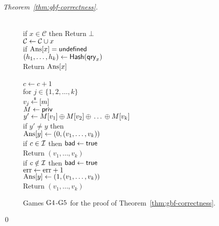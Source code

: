 \begin{proof}[Theorem~\ref{thm:gbf-correctness}]
\begin{figure}[tp]
{{\\
if $x \in \mathcal{C}$ then Return $\bot$\\
${\cal C} \gets {\cal C} \cup x$\\
if $\mathrm{Ans}[x] = \mathsf{undefined}$\\
\nudge $(h_1, \ldots, h_{k}) \gets \mathsf{Hash}(\mathsf{qry}_x)$\\
Return $\mathrm{Ans}[x]$\\
}
{
\\
$c \gets c + 1$\\
for $j \in \{1,2,\ldots,k\}$\\
\nudge $v_j {\:\stackrel{{\scriptscriptstyle \hspace{0.2em}\$}} {\leftarrow}\:} [m]$\\
%
$M \gets{\sf priv}$\\
$y' \gets M[v_1] {\:\oplus\:} M[v_2] {\:\oplus\:} \ldots {\:\oplus\:} M[v_k]$\\
if $y' \neq y$ then \\
\nudge $\mathrm{Ans}[y] \gets (0, (v_1, \ldots, v_{k}) )$\\
\nudge if $c \in {\cal I}$ then $\mathsf{bad} \gets \mathsf{true}$\\
\nudge Return $\left(v_1,\ldots,v_k\right)$\\
if $c \notin {\cal I}$ then $\mathsf{bad} \gets \mathsf{true}$\\
$\mathrm{err} \gets \mathrm{err} +1$\\
$\mathrm{Ans}[y] \gets (1, (v_1, \ldots, v_{k}))$\\
Return $\left(v_1,\ldots,v_k\right)$
}
}
\caption{Games $\text{G4}$-$\text{G5}$ for the
proof of Theorem~\ref{thm:gbf-correctness}.}
\label{fig:gbf-correctness-games2}
\end{figure}
\hfill\qed
\end{proof}
